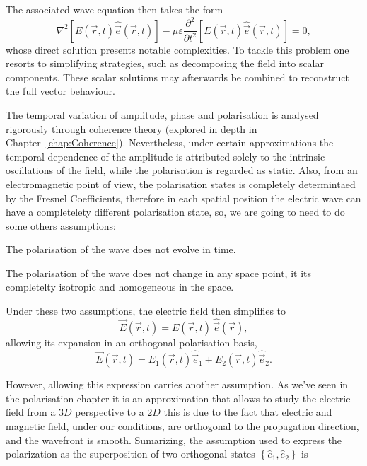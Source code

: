 	The associated wave equation then takes the form
	\begin{equation}
	\nabla^2 \left[ E(\vec{r},t)\hat{\vec{e}}(\vec{r},t) \right] - \mu\varepsilon \frac{\partial^2}{\partial t^2} \left[ E(\vec{r},t)\hat{\vec{e}}(\vec{r},t) \right] = 0,
	\end{equation}
	whose direct solution presents notable complexities. To tackle this problem one resorts to simplifying strategies, such as decomposing the field into scalar components. These scalar solutions may afterwards be combined to reconstruct the full vector behaviour.

	The temporal variation of amplitude, phase and polarisation is analysed rigorously through coherence theory (explored in depth in Chapter~\ref{chap:Coherence}). Nevertheless, under certain approximations the temporal dependence of the amplitude is attributed solely to the intrinsic oscillations of the field, while the polarisation is regarded as static. Also, from an electromagnetic point of view, the polarisation states is completely determintaed by the Fresnel Coefficients, therefore in each spatial position the electric wave can have a completelety different polarisation state, so, we are going to need to do some others assumptions:

	\begin{Assumption}
		The polarisation of the wave does not evolve in time.
	\end{Assumption}
	\begin{Assumption}
		The polarisation of the wave does not change in any space point, it its completelty isotropic and homogeneous in the space.
	\end{Assumption}

	Under these two assumptions, the electric field then simplifies to
	\begin{equation}
	\vec{E}(\vec{r},t) = E(\vec{r},t) \, \hat{\vec{e}}(\vec{r}),
	\end{equation}
	allowing its expansion in an orthogonal polarisation basis,
	\begin{equation}
	\vec{E}(\vec{r},t) = E_1(\vec{r},t)\hat{\vec{e}}_1 + E_2(\vec{r},t)\hat{\vec{e}}_2.
	\end{equation}

	However, allowing this expression carries another assumption. As we've seen in the polarisation chapter it is an approximation that allows to study the electric field from a $3D$ perspective to a $2D$ this is due to the fact that electric and magnetic field, under our conditions, are orthogonal to the propagation direction, and the wavefront is smooth. Sumarizing, the assumption used to express the polarization as the superposition of two orthogonal states $\left\{\hat{e}_1, \hat{e}_2 \right\}$ is

